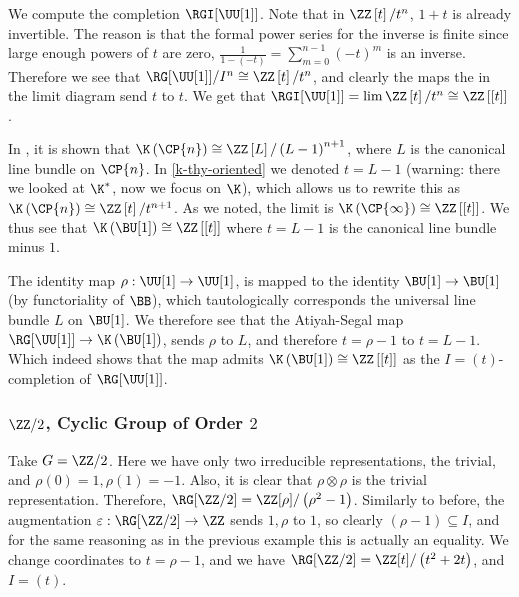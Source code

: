 We compute the completion $\RGI[{\UU[1]}]$.
Note that in $\ZZ\left[t\right]/t^n$, $1+t$ is already invertible.
The reason is that the formal power series for the inverse is finite since large enough powers of $t$ are zero, $\frac{1}{1-\left(-t\right)} = \sum_{m=0}^{n-1} \left(-t\right)^m$ is an inverse.
Therefore we see that $\RG[\UU[1]]/I^n \cong \ZZ\left[t\right]/t^n$, and clearly the maps the in the limit diagram send $t$ to $t$.
We get that $\RGI[{\UU[1]}] = \lim \ZZ\left[t\right]/t^n \cong \ZZ\left[\left[t\right]\right]$.

In \cite[proposition 2.24]{VB}, it is shown that $\K\left(\CP{n}\right) \cong \ZZ\left[L\right] / \left(L-1\right)^{n+1}$, where $L$ is the canonical line bundle on $\CP{n}$.
In \ref{k-thy-oriented} we denoted $t = L-1$ (warning: there we looked at $\K^*$, now we focus on $\K$), which allows us to rewrite this as $\K\left(\CP{n}\right) \cong \ZZ\left[t\right] / t^{n+1}$.
As we noted, the limit is $\K\left(\CP{\infty}\right) \cong \ZZ\left[\left[t\right]\right]$.
We thus see that $\K\left(\BU[1]\right) \cong \ZZ\left[\left[t\right]\right]$ where $t = L - 1$ is the canonical line bundle minus $1$.

The identity map $\rho: \UU[1] \to \UU[1]$, is mapped to the identity $\BU[1] \to \BU[1]$ (by functoriality of $\BB$), which tautologically corresponds the universal line bundle $L$ on $\BU[1]$.
We therefore see that the Atiyah-Segal map $\RG[\UU[1]] \to \K\left(\BU[1]\right)$, sends $\rho$ to $L$, and therefore $t = \rho - 1$ to $t = L - 1$.
Which indeed shows that the map admits $\K\left(\BU[1]\right) \cong \ZZ\left[\left[t\right]\right]$ as the $I = \left(t\right)$-completion of $\RG[\UU[1]]$.


\subsubsection{\texorpdfstring{$\ZZ/2$}{Z/2}, Cyclic Group of Order \texorpdfstring{$2$}{2}}

Take $G = \ZZ/2$.
Here we have only two irreducible representations, the trivial, and $\rho\left(0\right) = 1, \rho\left(1\right) = -1$.
Also, it is clear that $\rho \otimes \rho$ is the trivial representation.
Therefore, $\RG[\ZZ/2] = \ZZ[\rho]/\left(\rho^2-1\right)$.
Similarly to before, the augmentation $\varepsilon: \RG[\ZZ/2] \to \ZZ$ sends $1,\rho$ to $1$, so clearly $\left(\rho-1\right) \subseteq I$, and for the same reasoning as in the previous example this is actually an equality.
We change coordinates to $t = \rho-1$, and we have $\RG[\ZZ/2] = \ZZ[t]/\left(t^2+2t\right)$, and $I = \left(t\right)$.

